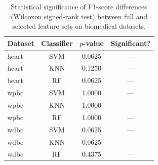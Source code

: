 \begin{table}[htbp]
\centering
\caption{Statistical significance of F1-score differences (Wilcoxon signed-rank test) between full and selected feature sets on biomedical datasets.}
\label{tab:statistical_validation}
\begin{tabular}{lccc}
\toprule
Dataset & Classifier & $p$-value & Significant? \\
\midrule
heart & SVM & 0.0625 & --- \\
heart & KNN & 0.1250 & --- \\
heart & RF & 0.0625 & --- \\
\midrule
wpbc & SVM & 1.0000 & --- \\
wpbc & KNN & 1.0000 & --- \\
wpbc & RF & 1.0000 & --- \\
\midrule
wdbc & SVM & 0.0625 & --- \\
wdbc & KNN & 0.0625 & --- \\
wdbc & RF & 0.4375 & --- \\
\bottomrule
\end{tabular}
\end{table}
